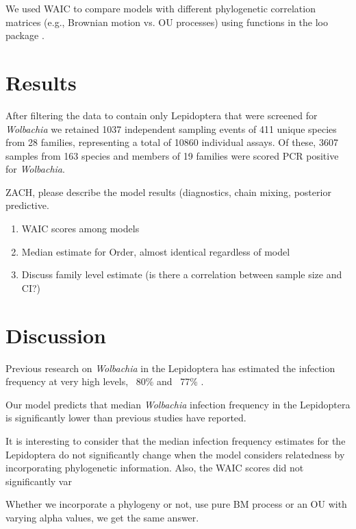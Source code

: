 \documentclass{frontiersSCNS} %
\begin{document}
We used WAIC \citep[the widely applicable or Watanabe-Akaike information criterion;][]{Watanabe:2010aa,Gelman:2014aa} to compare models with different phylogenetic correlation matrices (e.g., Brownian motion vs. OU processes) using functions in the loo package \citep{Vehtari:2016aa}. 

\section{Results}
After filtering the \citet{Weinert:2015aa} data to contain only Lepidoptera that were screened for \textit{Wolbachia} we retained 1037 independent sampling events of 411 unique species from 28 families, representing a total of 10860 individual assays. Of these, 3607 samples from 163 species and members of 19 families were scored PCR positive for \textit{Wolbachia}.

ZACH, please describe the model results (diagnostics, chain mixing, posterior predictive.

\begin{enumerate}  
\item WAIC scores among models
\item Median estimate for Order, almost identical regardless of model
\item Discuss family level estimate (is there a correlation between sample size and CI?)
\end{enumerate}


\section{Discussion}

Previous research on \textit{Wolbachia} in the Lepidoptera has estimated the infection frequency at very high levels, ~80\% \citet{Ahmed:2015aa} and ~77\% \citet{Weinert:2015aa}. 

Our model predicts that median \textit{Wolbachia} infection frequency in the Lepidoptera is significantly lower than previous studies have reported. 

It is interesting to consider that the median infection frequency estimates for the Lepidoptera do not significantly change when the model considers relatedness by incorporating phylogenetic information. Also, the WAIC scores did not significantly var

Whether we incorporate a phylogeny or not, use pure BM process or an OU with varying alpha values, we get the same answer. 
\end{document}
